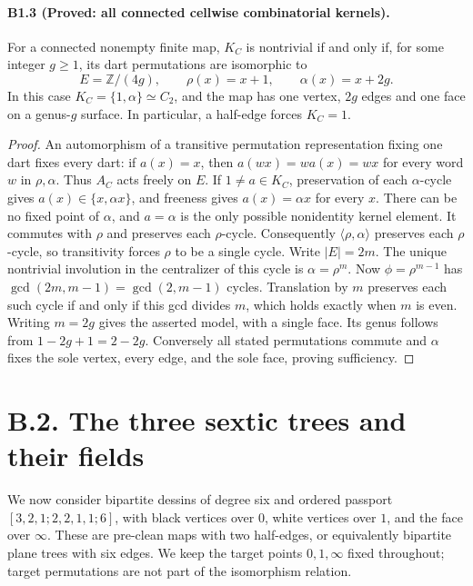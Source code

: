 \paragraph{B1.3 (Proved: all connected cellwise combinatorial kernels).}
For a connected nonempty finite map, $K_C$ is nontrivial if and only if,
for some integer $g\geq1$, its dart permutations are isomorphic to
\[
 E=\mathbb Z/(4g),\qquad \rho(x)=x+1,\qquad \alpha(x)=x+2g.
\]
In this case $K_C=\{1,\alpha\}\simeq C_2$, and the map has one vertex,
$2g$ edges and one face on a genus-$g$ surface. In particular, a half-edge
forces $K_C=1$.

\begin{proof}
An automorphism of a transitive permutation representation fixing one
dart fixes every dart: if $a(x)=x$, then
$a(w x)=w a(x)=w x$ for every word $w$ in $\rho,\alpha$.
Thus $A_C$ acts freely on $E$. If $1\ne a\in K_C$, preservation of
each $\alpha$-cycle gives $a(x)\in\{x,\alpha x\}$, and freeness gives
$a(x)=\alpha x$ for every $x$. There can be no fixed point of $\alpha$,
and $a=\alpha$ is the only possible nonidentity kernel element.
It commutes with $\rho$ and preserves each $\rho$-cycle. Consequently
$\langle\rho,\alpha\rangle$ preserves each $\rho$-cycle, so transitivity
forces $\rho$ to be a single cycle. Write $|E|=2m$.
The unique nontrivial involution in the centralizer of this cycle is
$\alpha=\rho^m$. Now $\phi=\rho^{m-1}$ has
$\gcd(2m,m-1)=\gcd(2,m-1)$ cycles. Translation by $m$ preserves each
such cycle if and only if this gcd divides $m$, which holds exactly when
$m$ is even. Writing $m=2g$ gives the asserted model, with a single
face. Its genus follows from $1-2g+1=2-2g$. Conversely all stated
permutations commute and $\alpha$ fixes the sole vertex, every edge,
and the sole face, proving sufficiency.
\end{proof}

\section{B.2. The three sextic trees and their fields}

We now consider bipartite dessins of degree six and ordered passport
$[3,2,1;2,2,1,1;6]$, with black vertices over $0$, white vertices over
$1$, and the face over $\infty$. These are pre-clean maps with two
half-edges, or equivalently bipartite plane trees with six edges.
We keep the target points $0,1,\infty$ fixed throughout; target
permutations are not part of the isomorphism relation.


